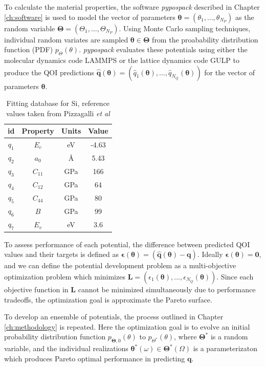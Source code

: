 To calculate the material properties, the software \emph{pypospack} described in Chapter \ref{ch:software} is used to model the vector of parameters $\bm{\theta} = (\theta_1,...,\theta_{N_P})$ as the random variable $\bm{\Theta} = (\Theta_1,...,\Theta_{N_P})$.
Using Monte Carlo sampling techniques, individual random variates are sampled $\bm{\theta} \in \bm{\Theta}$ from the proabability distribution function (PDF) $p_{\Theta}(\theta)$.
\emph{pypospack} evaluates these potentials using either the molecular dynamics code LAMMPS \cite{plimpton1995_lammps} or the lattice dynamics code GULP \cite{gale2003_gulp} to produce the QOI predictions
$\hat{\bm{q}}(\bm{\theta}) = (
    \hat{q}_1(\bm{\theta}),
    ...,
    \hat{q}_{N_Q}(\bm{\theta}))$ for the vector of parameters $\bm{\theta}$.

\begin{table}[htbp]
	\centering
	\caption{Fitting database for Si, reference values taken from Pizzagalli \emph{et al}\cite{pizzagalli2013_sw_Si}}
	\label{table:si_fitting_db}
	\begin{tabular}{c c c c}
		\hline
		id & Property & Units & Value \\
		\hline
		$q_1$ & $E_c$     & eV    & -4.63 \\
		$q_2$ & $a_0$     & \AA   &  5.43 \\
		$q_3$ & $C_{11}$ 	& GPa   & 166 \\
		$q_4$ & $C_{12}$  & GPa 	& 64 \\
		$q_5$ & $C_{44}$  & GPa   & 80 \\
		$q_6$ & $B$       & GPa   & 99 \\
		$q_7$ & $E_v$     & eV    & 3.6 \\
		\hline
	\end{tabular}
\end{table}

To assess performance of each potential, the difference between predicted QOI values and their targets is defined as $\bm{\epsilon}(\bm{\theta})=(\hat{\bm{q}}(\bm{\theta})-\bm{q})$.  Ideally  $\bm{\epsilon}(\bm{\theta}) = \bm{0}$, and we can define the potential development problem as a multi-objective optimization problem which minimizes $\bm{L} = (\epsilon_1(\bm{\theta}),...,\epsilon_{N_Q}(\bm{\theta}))$.
Since each objective function in $\bm{L}$ cannot be minimized simultaneously due to performance tradeoffs, the optimization goal is approximate the Pareto surface.

To develop an ensemble of potentials, the process outlined in Chapter \ref{ch:methodology} is repeated.  Here the optimization goal is to evolve an initial probability distribution function $p_{\bm{\Theta},0}(\theta)$ to $p_{\Theta^*}(\theta)$, where $\bm{\Theta}^*$ is a random variable, and the individual realizations $\bm{\theta}^*(\omega) \in \bm{\Theta}^*(\Omega)$ is a parameterizaton which produces Pareto optimal performance in predicting $\bm{q}$.
